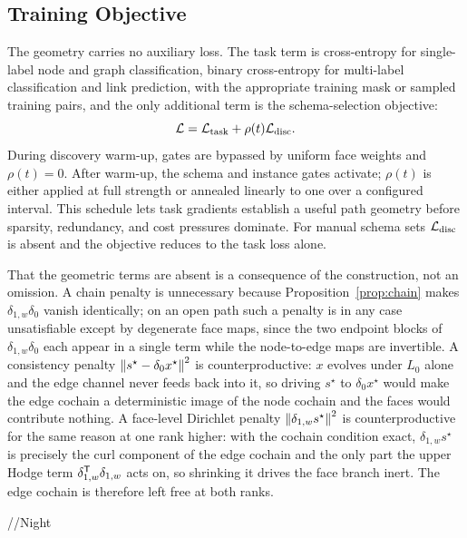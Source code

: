 \subsection{Training Objective}

The geometry carries no auxiliary loss.  The task term is cross-entropy for single-label node and
graph classification, binary cross-entropy for multi-label classification and link prediction, with
the appropriate training mask or sampled training pairs, and the only additional term is the
\ampss{} schema-selection objective:
\begin{equation}
  \mathcal{L}
  =\mathcal{L}_{\mathrm{task}}
   +\rho(t)\mathcal{L}_{\mathrm{disc}} .
  \label{eq:loss}
\end{equation}
During discovery warm-up, gates are bypassed by uniform face weights and \(\rho(t)=0\).  After
warm-up, the schema and instance gates activate; \(\rho(t)\) is either applied at full strength or
annealed linearly to one over a configured interval.  This schedule lets task gradients establish a
useful path geometry before sparsity, redundancy, and cost pressures dominate.  For manual schema
sets \(\mathcal{L}_{\mathrm{disc}}\) is absent and the objective reduces to the task loss alone.

That the geometric terms are absent is a consequence of the construction, not an omission.  A chain
penalty is unnecessary because Proposition~\ref{prop:chain} makes \(\delta_{1,w}\delta_0\) vanish
identically; on an open path such a penalty is in any case unsatisfiable except by degenerate face
maps, since the two endpoint blocks of \(\delta_{1,w}\delta_0\) each appear in a single term while the
node-to-edge maps are invertible.  A consistency penalty \(\left\lVert s^\star-\delta_0x^\star\right\rVert^2\) is
counterproductive: \(x\) evolves under \(L_0\) alone and the edge channel never feeds back into it, so
driving \(s^\star\) to \(\delta_0x^\star\) would make the edge cochain a deterministic image of the
node cochain and the faces would contribute nothing.  A face-level Dirichlet penalty
\(\left\lVert \delta_{1,w}s^\star\right\rVert^2\) is counterproductive for the same reason at one rank higher: with the
cochain condition exact, \(\delta_{1,w}s^\star\) is precisely the curl component of the edge cochain
and the only part the upper Hodge term \(\delta_{1,w}^{\mathsf{T}}\delta_{1,w}\) acts on, so shrinking
it drives the face branch inert.  The edge cochain is therefore left free at both ranks.



//Night
\documentclass[sigconf,anonymous,review]{acmart}

